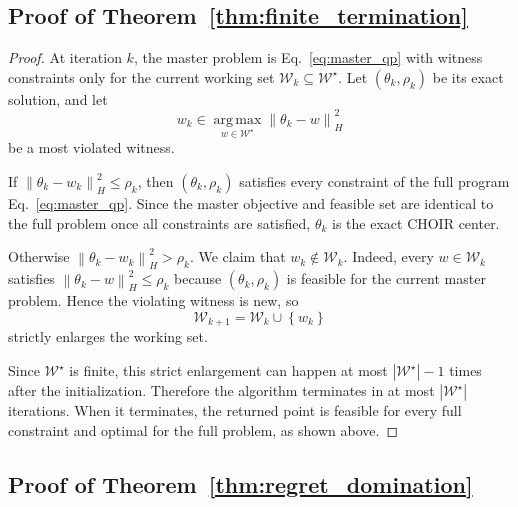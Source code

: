 \documentclass{article}
\newcommand{\cW}{\mathcal{W}}
\newcommand{\argmax}{\operatorname*{arg\,max}}
\newcommand{\choir}{\textup{\textsc{CHOIR}}}
\newcommand{\norm}[1]{\left\lVert #1 \right\rVert}
\newcommand{\abs}[1]{\left\lvert #1 \right\rvert}
\newcommand{\braces}[1]{\left\{ #1 \right\}}
\begin{document}
\subsection{Proof of Theorem~\ref{thm:finite_termination}}

\begin{proof}
At iteration \(k\), the master problem is Eq.~\eqref{eq:master_qp} with witness constraints only for the current working set \(\cW_k\subseteq\cW^\star\). Let \((\theta_k,\rho_k)\) be its exact solution, and let
\[
w_k \in \argmax_{w\in\cW^\star}\norm{\theta_k-w}_H^2
\]
be a most violated witness.

If \(\norm{\theta_k-w_k}_H^2 \le \rho_k\), then \((\theta_k,\rho_k)\) satisfies every constraint of the full program Eq.~\eqref{eq:master_qp}. Since the master objective and feasible set are identical to the full problem once all constraints are satisfied, \(\theta_k\) is the exact \choir{} center.

Otherwise \(\norm{\theta_k-w_k}_H^2 > \rho_k\). We claim that \(w_k\notin \cW_k\). Indeed, every \(w\in \cW_k\) satisfies \(\norm{\theta_k-w}_H^2 \le \rho_k\) because \((\theta_k,\rho_k)\) is feasible for the current master problem. Hence the violating witness is new, so
\[
\cW_{k+1} = \cW_k \cup \braces{w_k}
\]
strictly enlarges the working set.

Since \(\cW^\star\) is finite, this strict enlargement can happen at most \(\abs{\cW^\star}-1\) times after the initialization. Therefore the algorithm terminates in at most \(\abs{\cW^\star}\) iterations. When it terminates, the returned point is feasible for every full constraint and optimal for the full problem, as shown above.
\end{proof}

\subsection{Proof of Theorem~\ref{thm:regret_domination}}
\end{document}
